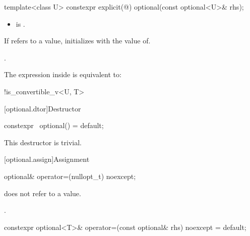   \begin{itemdecl}
    template<class U> constexpr explicit(@\seebelow@) optional(const optional<U>& rhs);
  \end{itemdecl}

  \begin{itemdescr}
    \pnum
    \constraints
    \begin{itemize}
    \item {} is .
    \end{itemize}

    \pnum
    \effects
    If  refers to a value,
    initializes  with the value of.

    \pnum
    \ensures
    .

    \pnum
    \remarks
    The expression inside  is equivalent to:
    \begin{codeblock}
      !is_convertible_v<U, T>
    \end{codeblock}

  \end{itemdescr}


  [optional.dtor]{Destructor}

  \begin{itemdecl}
    constexpr ~optional() = default;
  \end{itemdecl}
\begin{itemdescr}
\pnum
\remarks
This destructor is trivial.
\end{itemdescr}

  [optional.assign]{Assignment}

  \begin{itemdecl}
    optional& operator=(nullopt_t) noexcept;
  \end{itemdecl}

  \begin{itemdescr}
    \pnum
    \ensures
     does not refer to a value.

    \pnum
    \returns
    .
  \end{itemdescr}

  \begin{itemdecl}
    constexpr optional<T>& operator=(const optional& rhs) noexcept = default;
  \end{itemdecl}

